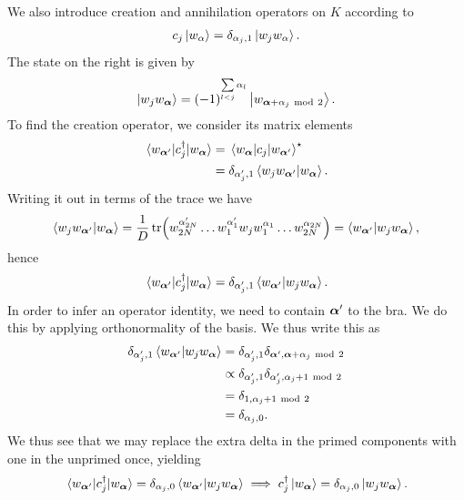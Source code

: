 We also introduce creation and annihilation operators on $K$ according to
\begin{align*}
	c_{j}\ket{w_{\vb{\alpha}}} = \delta_{\alpha_{j}, 1}\ket{w_{j}w_{\vb{\alpha}}}.
\end{align*}
The state on the right is given by
\begin{align*}
	\ket{w_{j}w_{\vb*{\alpha}}} = (-1)^{\sum\limits_{l < j}\alpha_{l}}\ket{w_{\vb*{\alpha} + \alpha_{j}\ \text{mod}\  2}}.
\end{align*}
To find the creation operator, we consider its matrix elements
\begin{align*}
	\mel{w_{\vb*{\alpha}\ensuremath{^{\prime}}}}{c_{j}\ensuremath{^{\dagger}}}{w_{\vb*{\alpha}}} &= \mel{w_{\vb*{\alpha}}}{c_{j}}{w_{\vb*{\alpha}\ensuremath{^{\prime}}}}^{\star} \\
	                                                      &= \delta_{\alpha_{j}^{\prime}, 1}\braket{w_{j}w_{\vb*{\alpha}^{\prime}}}{w_{\vb*{\alpha}}}.
\end{align*}
Writing it out in terms of the trace we have
\begin{align*}
	\braket{w_{j}w_{\vb*{\alpha}^{\prime}}}{w_{\vb*{\alpha}}} = \frac{1}{D}\tr(w_{2N}^{\alpha_{2N}^{\prime}}\dots w_{1}^{\alpha_{1}^{\prime}}w_{j}w_{1}^{\alpha_{1}}\dots w_{2N}^{\alpha_{2N}}) = \braket{w_{\vb*{\alpha}^{\prime}}}{w_{j}w_{\vb*{\alpha}}},
\end{align*}
hence
\begin{align*}
	\mel{w_{\vb*{\alpha}\ensuremath{^{\prime}}}}{c_{j}\ensuremath{^{\dagger}}}{w_{\vb*{\alpha}}} = \delta_{\alpha_{j}^{\prime}, 1}\braket{w_{\vb*{\alpha}^{\prime}}}{w_{j}w_{\vb*{\alpha}}}.
\end{align*}
In order to infer an operator identity, we need to contain $\vb*{\alpha}^{\prime}$ to the bra. We do this by applying orthonormality of the basis. We thus write this as
\begin{align*}
	\delta_{\alpha_{j}^{\prime}, 1}\braket{w_{\vb*{\alpha}^{\prime}}}{w_{j}w_{\vb*{\alpha}}} &= \delta_{\alpha_{j}^{\prime}, 1}\delta_{\vb*{\alpha}^{\prime}, \vb*{\alpha} + \alpha_{j}\ \text{mod}\  2} \\
	&\propto \delta_{\alpha_{j}^{\prime}, 1}\delta_{\alpha_{j}^{\prime}, \alpha_{j} + 1\ \text{mod}\  2} \\
	&= \delta_{1, \alpha_{j} + 1\ \text{mod}\  2} \\
	&= \delta_{\alpha_{j}, 0}.
\end{align*}
We thus see that we may replace the extra delta in the primed components with one in the unprimed once, yielding
\begin{align*}
	\mel{w_{\vb*{\alpha}\ensuremath{^{\prime}}}}{c_{j}\ensuremath{^{\dagger}}}{w_{\vb*{\alpha}}} = \delta_{\alpha_{j}, 0}\braket{w_{\vb*{\alpha}^{\prime}}}{w_{j}w_{\vb*{\alpha}}} \implies c_{j}^{\dagger}\ket{w_{\vb*{\alpha}}} = \delta_{\alpha_{j}, 0}\ket{w_{j}w_{\vb*{\alpha}}}.
\end{align*}

